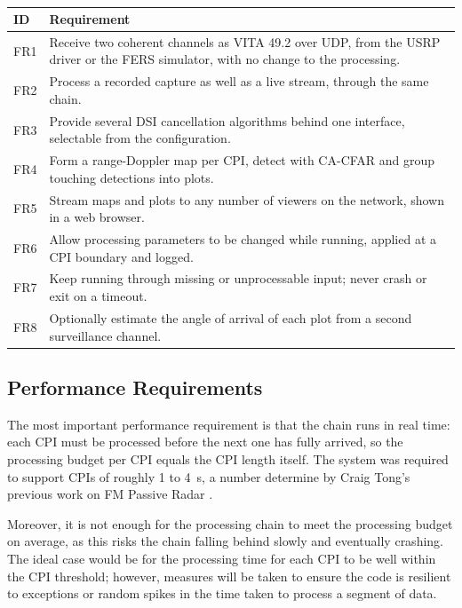 \begin{table}[H]
    \centering
    \caption[TODO]{}
    \label{tab:ch3.functional}
    \begin{tabularx}{\textwidth}{>{\raggedright\arraybackslash}p{1.2cm}>{\raggedright\arraybackslash}X}
    \toprule
    \textbf{ID} & \textbf{Requirement} \\
    \midrule
    FR1 & Receive two coherent channels as VITA 49.2 over UDP, from the USRP driver or the FERS simulator, with no change to the processing. \\
    FR2 & Process a recorded capture as well as a live stream, through the same chain. \\
    FR3 & Provide several DSI cancellation algorithms behind one interface, selectable from the configuration. \\
    FR4 & Form a range-Doppler map per CPI, detect with CA-CFAR and group touching detections into plots. \\
    FR5 & Stream maps and plots to any number of viewers on the network, shown in a web browser. \\
    FR6 & Allow processing parameters to be changed while running, applied at a CPI boundary and logged. \\
    FR7 & Keep running through missing or unprocessable input; never crash or exit on a timeout. \\
    FR8 & Optionally estimate the angle of arrival of each plot from a second surveillance channel. \\
    \bottomrule
    \end{tabularx}
\end{table}

\subsection{Performance Requirements}
\label{subsec:ch3.requirements.performance}

The most important performance requirement is that the chain runs in real time: each CPI must be processed before the next one has fully arrived, so the processing budget per CPI equals the CPI length itself. The system was required to support CPIs of roughly 1 to 4~s, a number determine by Craig Tong's previous work on FM Passive Radar . 

Moreover, it is not enough for the processing chain to meet the processing budget on average, as this risks the chain falling behind slowly and eventually crashing. The ideal case would be for the processing time for each CPI to be well within the CPI threshold; however, measures will be taken to ensure the code is resilient to exceptions or random spikes in the time taken to process a segment of data.

